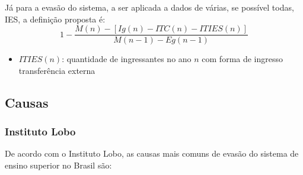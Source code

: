 \documentclass{report}
\begin{document}
Já para a evasão do sistema, a ser aplicada a dados de várias, se possível todas, IES, a definição proposta é:
\begin{equation}
1 - \frac{M(n) - [Ig(n) - ITC(n) - ITIES(n)]}{M(n-1) - Eg(n-1)}
\end{equation}
\begin{itemize}
\item $ITIES(n)$: quantidade de ingressantes no ano $n$ com forma de ingresso transferência externa
\end{itemize}


\subsection{Causas}

\subsubsection{Instituto Lobo}
De acordo com o Instituto Lobo\cite{evasao_panorama2}, as causas mais comuns de evasão do sistema de ensino superior no Brasil são:
\end{document}
